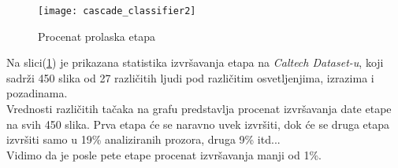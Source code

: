 \newpage

\begin{figure}[h]
  \centering
  \texttt{[image: cascade\_classifier2]}
  \caption{Procenat prolaska etapa}
  \label{cascade_classifier_img2}
\end{figure}

Na slici(\ref{cascade_classifier_img2}) je prikazana statistika izvršavanja
etapa na \emph{Caltech Dataset-u}\cite{CALTECH_DATASET}, koji sadrži 450 slika
od 27 različitih ljudi pod različitim osvetljenjima, izrazima i pozadinama. \\

Vrednosti različitih tačaka na grafu predstavlja procenat izvršavanja date etape
na svih 450 slika. Prva etapa će se naravno uvek izvršiti, dok će se druga etapa
izvršiti samo u 19\% analiziranih prozora, druga 9\% itd... \\
Vidimo da je posle pete etape procenat izvršavanja manji od 1\%. \\